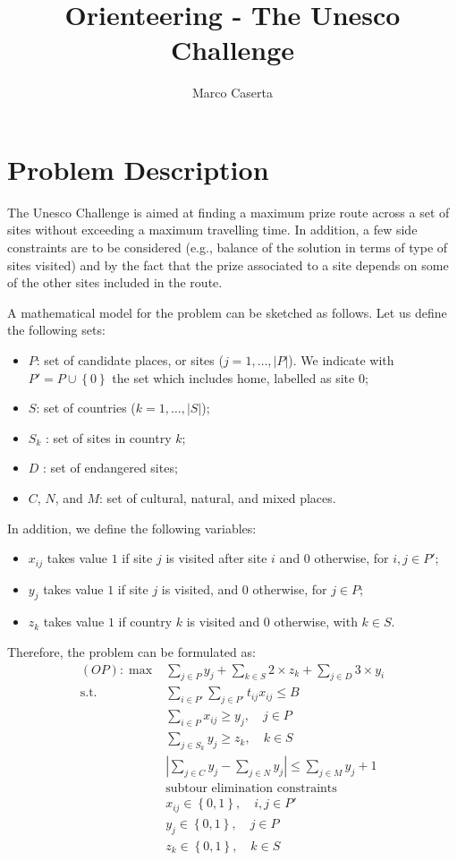 \documentclass[12pt]{article}
\title{Orienteering - The Unesco Challenge}
\author{Marco Caserta}
\date{}
\begin{document}
\maketitle

\section{Problem Description}

The Unesco Challenge is aimed at finding a maximum prize route across a set
of sites without exceeding a maximum travelling time. In addition, a few side
constraints are to be considered (e.g., balance of the solution in terms of
type of sites visited) and by the fact that the prize associated to a site
depends on some of the other sites included in the route.

A mathematical model for the problem can be sketched as follows. Let us define
the following sets:
\begin{itemize}
\item $P$: set of candidate places, or sites ($j=1,\dots,|P|$). We indicate with $P' = P
\cup\left\{ 0 \right\}$ the set which includes home, labelled as site
$0$;
\item $S$: set of countries ($k=1,\dots,|S|$);
\item $S_k$ : set of sites in country $k$;
\item $D$ : set of endangered sites;
\item $C$, $N$, and $M$: set of cultural, natural, and mixed places.
\end{itemize}
In addition, we define the following variables:
\begin{itemize}
\item $x_{ij}$ takes value $1$ if site $j$ is visited after site $i$ and
$0$ otherwise, for $i,j \in P'$;
\item $y_j$ takes value $1$ if site $j$ is visited, and $0$ otherwise, for $j
\in P$;
\item $z_k$ takes value $1$ if country $k$ is visited and $0$ otherwise, with
$k \in S$.
\end{itemize}
Therefore, the problem can be formulated as:
\begin{align}
 (OP): \max & \sum_{j\in P} y_j + \sum_{k \in S} 2\times z_k + \sum_{j \in D}3\times
  y_i\\
  \mbox{s.t.} \;\;\;\;   &  
    \sum_{i\in P'} \sum_{j\in P'} t_{ij}x_{ij} \leq B
    \label{eq:budget}\\
    & \sum_{i\in P} x_{ij} \geq y_j, \quad j \in P \label{eq:selected}\\
    & \sum_{j\in S_k} y_{j} \geq z_k, \quad k \in S\label{eq:country}\\
    & | \sum_{j\in C} y_j - \sum_{j \in N} y_j | \leq \sum_{j\in M}
    y_j + 1 \label{eq:balance}\\
    & \text{subtour elimination constraints}\\
    & x_{ij} \in \left\{ 0,1 \right\}, \quad i,j \in P' \\
    & y_{j} \in \left\{ 0,1 \right\}, \quad j \in P \\
    & z_{k} \in \left\{ 0,1 \right\}, \quad k \in S
\end{align}
\end{document}
